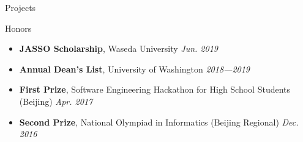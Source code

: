 \documentclass{resume}
\begin{document}
\begin{rSection}{Projects}



	\end{rSection}
	\vspace{-5pt}
	

	\begin{rSection}{Honors}
		\begin{itemize}
			\setlength{\itemsep}{1pt}
			\setlength{\parskip}{0pt}
			\setlength{\parsep}{0pt}
			\item \textbf{JASSO Scholarship}, Waseda University \hfill {\em Jun. 2019}
			\item \textbf{Annual Dean's List}, University of Washington \hfill {\em 2018---2019}
			\item \textbf{First Prize}, Software Engineering Hackathon for High School Students (Beijing) \hfill {\em Apr. 2017}
			\item \textbf{Second Prize}, National Olympiad in Informatics (Beijing Regional) \hfill {\em Dec. 2016}
		\end{itemize}
	\end{rSection}
\end{document}
